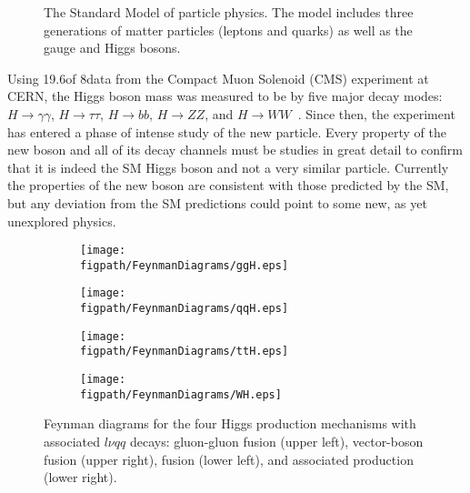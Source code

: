 \begin{figure}[!hbt]
	\centering
	\resizebox{0.55\textwidth}{!}{}
	\caption{The Standard Model of particle physics. The model includes three generations of matter particles (leptons and quarks) as well as the gauge and Higgs bosons.}
	\label{fig:standard_model}
\end{figure}

Using 19.6\fbinv of 8\tev data from the Compact Muon Solenoid (CMS) experiment at CERN, the Higgs boson mass was measured to be  by five major decay modes: $H\rightarrow\gamma\gamma$, $H\rightarrow\tau\tau$, $H\rightarrow{bb}$, $H\rightarrow{ZZ}$, and $H\rightarrow{WW}$~\cite{CMS-PAS-HIG-13-005}.
Since then, the experiment has entered a phase of intense study of the new particle.
Every property of the new boson and all of its decay channels must be studies in great detail to confirm that it is indeed the SM Higgs boson and not a very similar particle.
Currently the properties of the new boson are consistent with those predicted by the SM, but any deviation from the SM predictions could point to some new, as yet unexplored physics.

\begin{figure}[bt]
	\centering
	\begin{subfigure}[t]{0.415\textwidth}
		\texttt{[image: \\figpath/FeynmanDiagrams/ggH.eps]}
		\label{fig:ggH}
	\end{subfigure}%
	\begin{subfigure}[t]{0.415\textwidth}
		\texttt{[image: \\figpath/FeynmanDiagrams/qqH.eps]}
		\label{fig:qqH}
	\end{subfigure}

	\begin{subfigure}[t]{0.415\textwidth}
		\texttt{[image: \\figpath/FeynmanDiagrams/ttH.eps]}
		\label{fig:ttH}
	\end{subfigure}%
	\begin{subfigure}[t]{0.415\textwidth}
		\texttt{[image: \\figpath/FeynmanDiagrams/WH.eps]}
		\label{fig:WH}
	\end{subfigure}
	\caption{Feynman diagrams for the four Higgs production mechanisms with associated $l{\nu}qq$ decays: gluon-gluon fusion (upper left), vector-boson fusion (upper right), \ttbar fusion (lower left), and associated production (lower right).}
	\label{fig:Higgs_WW_lnujj_feynman}
\end{figure}

